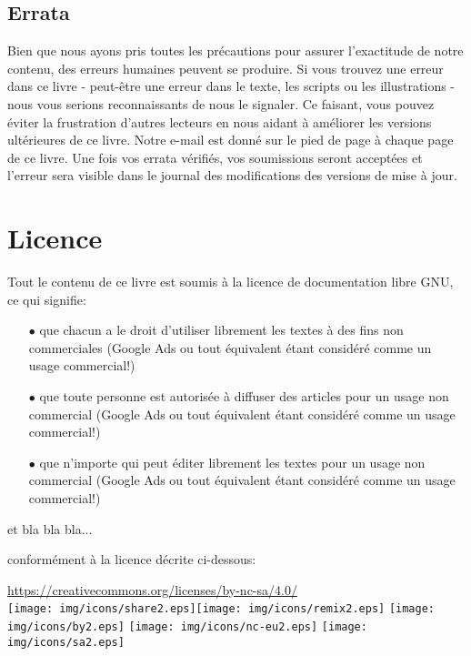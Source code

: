 	\subsection{Errata}
	Bien que nous ayons pris toutes les précautions pour assurer l'exactitude de notre contenu, des erreurs humaines peuvent se produire. Si vous trouvez une erreur dans ce livre - peut-être une erreur dans le texte, les scripts ou les illustrations - nous vous serions reconnaissants de nous le signaler. Ce faisant, vous pouvez éviter la frustration d'autres lecteurs en nous aidant à améliorer les versions ultérieures de ce livre. Notre e-mail est donné sur le pied de page à chaque page de ce livre. Une fois vos errata vérifiés, vos soumissions seront acceptées et l'erreur sera visible dans le journal des modifications des versions de mise à jour.

	\newpage
	\thispagestyle{empty}
	\mbox{}
	\section{Licence}
	Tout le contenu de ce livre est soumis à la licence de documentation libre GNU, ce qui signifie:
	\begin{itemize}
			\item[$\bullet$] que chacun a le droit d'utiliser librement les textes à des fins non commerciales (Google Ads ou tout équivalent étant considéré comme un usage commercial!)
			\item[$\bullet$] que toute personne est autorisée à diffuser des articles pour un usage non commercial (Google Ads ou tout équivalent étant considéré comme un usage commercial!)
			\item[$\bullet$] que n'importe qui peut éditer librement les textes pour un usage non commercial (Google Ads ou tout équivalent étant considéré comme un usage commercial!)
	\end{itemize}
	
	et bla bla bla...

	conformément à la licence décrite ci-dessous: 
	
	\begin{center}
	\url{https://creativecommons.org/licenses/by-nc-sa/4.0/}\\[2pt]
\texttt{[image: img/icons/share2.eps]}\texttt{[image: img/icons/remix2.eps]}
\texttt{[image: img/icons/by2.eps]}
\texttt{[image: img/icons/nc-eu2.eps]}
\texttt{[image: img/icons/sa2.eps]}
	\end{center}

